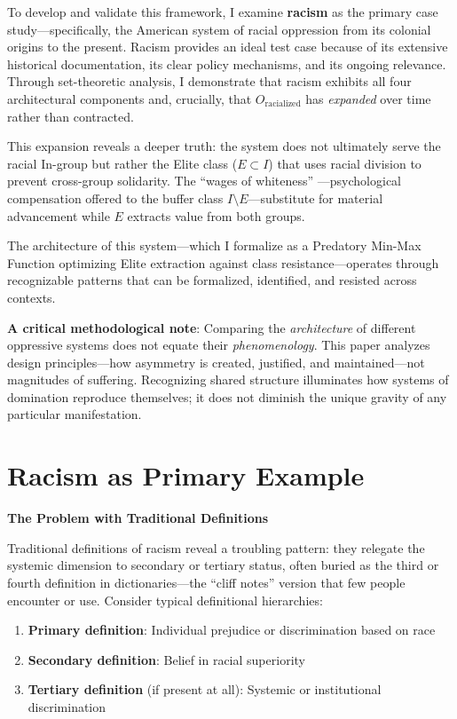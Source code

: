 \documentclass[12pt,openany]{book}
\begin{document}
To develop and validate this framework, I examine \textbf{racism} as the primary case study---specifically, the American system of racial oppression from its colonial origins to the present. Racism provides an ideal test case because of its extensive historical documentation, its clear policy mechanisms, and its ongoing relevance. Through set-theoretic analysis, I demonstrate that racism exhibits all four architectural components and, crucially, that $O_{\text{racialized}}$ has \textit{expanded} over time rather than contracted.

This expansion reveals a deeper truth: the system does not ultimately serve the racial In-group but rather the Elite class ($E \subset I$) that uses racial division to prevent cross-group solidarity. The ``wages of whiteness'' \cite{roediger, dubois}---psychological compensation offered to the buffer class $I \setminus E$---substitute for material advancement while $E$ extracts value from both groups.

The architecture of this system---which I formalize as a Predatory Min-Max Function optimizing Elite extraction against class resistance---operates through recognizable patterns that can be formalized, identified, and resisted across contexts.

\textbf{A critical methodological note}: Comparing the \textit{architecture} of different oppressive systems does not equate their \textit{phenomenology}. This paper analyzes design principles---how asymmetry is created, justified, and maintained---not magnitudes of suffering. Recognizing shared structure illuminates how systems of domination reproduce themselves; it does not diminish the unique gravity of any particular manifestation.

\section{Racism as Primary Example}

\textbf{The Problem with Traditional Definitions}

Traditional definitions of racism reveal a troubling pattern: they relegate the systemic dimension to secondary or tertiary status, often buried as the third or fourth definition in dictionaries---the ``cliff notes'' version that few people encounter or use. Consider typical definitional hierarchies:

\begin{enumerate}
    \item \textbf{Primary definition}: Individual prejudice or discrimination based on race
    \item \textbf{Secondary definition}: Belief in racial superiority
    \item \textbf{Tertiary definition} (if present at all): Systemic or institutional discrimination
\end{enumerate}
\end{document}
